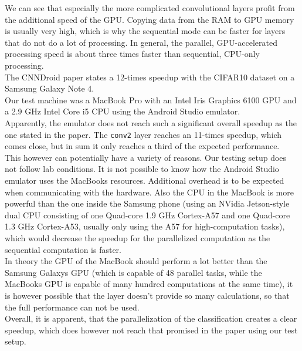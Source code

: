 We can see that especially the more complicated convolutional layers profit from the additional speed of the GPU. Copying data from the RAM to GPU memory is usually very high, which is why the sequential mode can be faster for layers that do not do a lot of processing. In general, the parallel, GPU-accelerated processing speed is about three times faster than sequential, CPU-only processing.\\
The CNNDroid paper\cite{cnndroid2016} states a 12-times speedup with the CIFAR10 dataset on a Samsung Galaxy Note 4.\\
Our test machine was a MacBook Pro with an Intel Iris Graphics 6100 GPU and a 2.9 GHz Intel Core i5 CPU using the Android Studio emulator.\\
Apparently, the emulator does not reach such a significant overall speedup as the one stated in the paper. The \texttt{conv2} layer reaches an 11-times speedup, which comes close, but in sum it only reaches a third of the expected performance.\\
This however can potentially have a variety of reasons. Our testing setup does not follow lab conditions. It is not possible to know how the Android Studio emulator uses the MacBooks resources. Additional overhead is to be expected when communicating with the hardware. Also the CPU in the MacBook is more powerful than the one inside the Samsung phone (using an NVidia Jetson-style dual CPU consisting of one Quad-core 1.9 GHz Cortex-A57 and one Quad-core 1.3 GHz Cortex-A53, usually only using the A57 for high-computation tasks), which would decrease the speedup for the parallelized computation as the sequential computation is faster.\\
In theory the GPU of the MacBook should perform a lot better than the Samsung Galaxys GPU (which is capable of 48 parallel tasks, while the MacBooks GPU is capable of many hundred computations at the same time), it is however possible that the layer doesn't provide so many calculations, so that the full performance can not be used.\\
Overall, it is apparent, that the parallelization of the classification creates a clear speedup, which does however not reach that promised in the paper using our test setup.